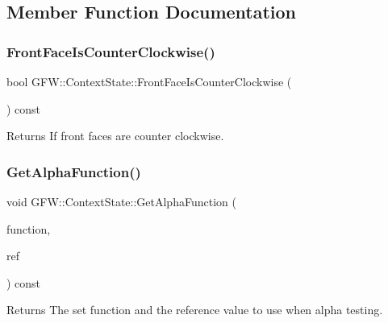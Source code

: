 \subsection{Member Function Documentation}
\mbox{\label{class_g_f_w_1_1_context_state_a6e3342e574aa0a9811563f8575ed1f0f}} 
\subsubsection{\texorpdfstring{Front\+Face\+Is\+Counter\+Clockwise()}{FrontFaceIsCounterClockwise()}}
{\footnotesize\ttfamily bool G\+F\+W\+::\+Context\+State\+::\+Front\+Face\+Is\+Counter\+Clockwise (\begin{DoxyParamCaption}{ }\end{DoxyParamCaption}) const}

\begin{DoxyReturn}{Returns}
If front faces are counter clockwise. 
\end{DoxyReturn}
\mbox{\label{class_g_f_w_1_1_context_state_a52d1f42170e2e2e6018307f09f27492a}} 
\subsubsection{\texorpdfstring{Get\+Alpha\+Function()}{GetAlphaFunction()}}
{\footnotesize\ttfamily void G\+F\+W\+::\+Context\+State\+::\+Get\+Alpha\+Function (\begin{DoxyParamCaption}\item[{\hyperlink{namespace_g_f_w_a2eabb5a646179bceaab2d5e3bfce2316}{Test\+Function} \&}]{function,  }\item[{float \&}]{ref }\end{DoxyParamCaption}) const}

\begin{DoxyReturn}{Returns}
The set function and the reference value to use when alpha testing. 
\end{DoxyReturn}

